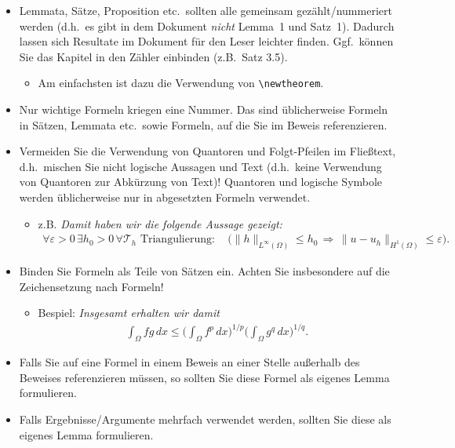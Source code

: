 \documentclass[a4paper,11pt,bibliography=totoc,listof=totoc,headinclude=true,cleardoublepage=empty,oneside]{scrbook}
\begin{document}
{\begin{itemize}
\item Lemmata, Sätze, Proposition etc.\ sollten alle gemeinsam gezählt/nummeriert werden (d.h.\ es gibt in dem Dokument \emph{nicht} Lemma~1 und Satz~1). Dadurch lassen sich Resultate im Dokument für den Leser leichter finden. Ggf.\ können Sie das Kapitel in den Zähler einbinden (z.B.\ Satz 3.5).
\begin{itemize}
\item Am einfachsten ist dazu die Verwendung von \verb$\newtheorem$.
\end{itemize}

\item Nur wichtige Formeln kriegen eine Nummer. Das sind üblicherweise Formeln in Sät\-zen, Lemmata etc.\ sowie Formeln, auf die Sie im Beweis referenzieren.

\item Vermeiden Sie die Verwendung von Quantoren und Folgt-Pfeilen im Fließtext, d.h.\ mischen Sie nicht logische Aussagen und Text (d.h.\ keine Verwendung von Quantoren zur Abkürzung von Text)! Quantoren und logische Symbole werden üblicherweise nur in abgesetzten Formeln verwendet. 
\begin{itemize}
\item z.B. \emph{Damit haben wir die folgende Aussage gezeigt:
\begin{align*}
 \forall \varepsilon > 0 \, \exists h_0 > 0 \, \forall \mathcal{T}_h\text{ Triangulierung}:
 \quad \Big( \| h \|_{L^\infty(\Omega)} \le h_0
 \, \Longrightarrow \,
 \| u - u_h \|_{H^1(\Omega)} \le \varepsilon \Big).
\end{align*}}
\end{itemize}

\item Binden Sie Formeln als Teile von Sätzen ein. Achten Sie insbesondere auf die Zeichensetzung nach Formeln!
\begin{itemize}
\item Bespiel: \emph{Insgesamt erhalten wir damit
\begin{align*}
 \int_\Omega fg\,dx 
 \le \bigg(\int_\Omega f^p \, dx\bigg)^{1/p} \bigg(\int_\Omega g^q \, dx\bigg)^{1/q}.
\end{align*}}
\end{itemize}

\item Falls Sie auf eine Formel in einem Beweis an einer Stelle außerhalb des Beweises referenzieren müssen, so sollten Sie diese Formel als eigenes Lemma formulieren.

\item Falls Ergebnisse/Argumente mehrfach verwendet werden, sollten Sie diese als eigenes Lemma formulieren.


\end{itemize}}
\end{document}
